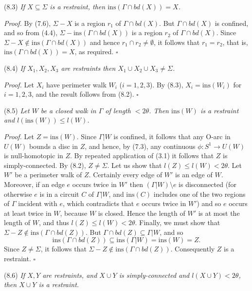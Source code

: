 \stmt
(8.3) \textit{If $X \subseteq \Sigma$ is a restraint, then $\mathrm{ins}(\Gamma \cap bd(X)) = X$.}

\textit{Proof.} By (7.6), $\Sigma - X$ is a region $r_1$ of $\Gamma \cap bd(X)$. But $\Gamma \cap bd(X)$ is confined, and so from (4.4), $\Sigma - \mathrm{ins}(\Gamma \cap bd(X))$ is a region $r_2$ of $\Gamma \cap bd(X)$. Since $\Sigma - X \notin \mathrm{ins}(\Gamma \cap bd(X))$ and hence $r_1 \cap r_2 \ne \emptyset$, it follows that $r_1 = r_2$, that is, $\mathrm{ins}(\Gamma \cap bd(X)) = X$, as required. $\square$

\stmt
(8.4) \textit{If $X_1, X_2, X_3$ are restraints then $X_1 \cup X_2 \cup X_3 \ne \Sigma$.}

\textit{Proof.} Let $X_i$ have perimeter walk $W_i$ ($i = 1, 2, 3$). By (8.3), $X_i = \mathrm{ins}(W_i)$ for $i = 1, 2, 3$, and the result follows from (8.2). $\square$

\stmt
(8.5) \textit{Let $W$ be a closed walk in $\Gamma$ of length $< 2\theta$. Then $\mathrm{ins}(W)$ is a restraint and $l(\mathrm{ins}(W)) \le l(W)$.}

\textit{Proof.} Let $Z = \mathrm{ins}(W)$. Since $\Gamma | W$ is confined, it follows that any O-arc in $U(W)$ bounds a disc in $Z$, and hence, by (7.3), any continuous $\phi \colon S^1 \to U(W)$ is null-homotopic in $Z$. By repeated application of (3.1) it follows that $Z$ is simply-connected. By (8.2), $Z \ne \Sigma$. Let us show that $l(Z) \le l(W) < 2\theta$. Let $W'$ be a perimeter walk of $Z$. Certainly every edge of $W'$ is an edge of $W$. Moreover, if an edge $e$ occurs twice in $W'$ then $(\Gamma | W) \setminus e$ is disconnected (for otherwise $e$ is in a circuit $C$ of $\Gamma | W$, and $\mathrm{ins}(C)$ includes one of the two regions of $\Gamma$ incident with $e$, which contradicts that $e$ occurs twice in $W'$) and so $e$ occurs at least twice in $W$, because $W$ is closed. Hence the length of $W'$ is at most the length of $W$, and thus $l(Z) \le l(W) < 2\theta$. Finally, we must show that $\Sigma - Z \notin \mathrm{ins}(\Gamma \cap bd(Z))$. But $\Gamma \cap bd(Z) \subseteq \Gamma | W$, and so
\begin{equation*}
\mathrm{ins}(\Gamma \cap bd(Z)) \subseteq \mathrm{ins}(\Gamma | W) = \mathrm{ins}(W) = Z.
\end{equation*}
Since $Z \ne \Sigma$, it follows that $\Sigma - Z \notin \mathrm{ins}(\Gamma \cap bd(Z))$. Consequently $Z$ is a restraint. $\square$

\stmt
(8.6) \textit{If $X, Y$ are restraints, and $X \cup Y$ is simply-connected and $l(X \cup Y) < 2\theta$, then $X \cup Y$ is a restraint.}


